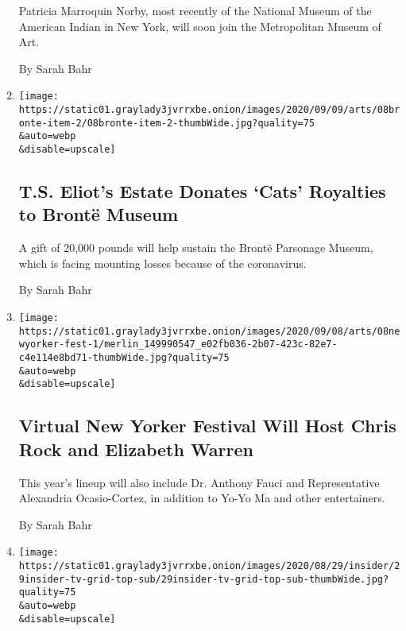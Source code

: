 \begin{enumerate}
  Patricia Marroquin Norby, most recently of the National Museum of the
  American Indian in New York, will soon join the Metropolitan Museum of
  Art.

  By Sarah Bahr
\item
  \href{/2020/09/08/arts/design/ts-eliot-cats-royalties-bronte-museum.html}{}

  \texttt{[image: https://static01.graylady3jvrrxbe.onion/images/2020/09/09/arts/08bronte-item-2/08bronte-item-2-thumbWide.jpg?quality=75\\\&auto=webp\\\&disable=upscale]}

  \hypertarget{ts-eliots-estate-donates-cats-royalties-to-brontuxeb-museum}{%
  \subsection{T.S. Eliot's Estate Donates `Cats' Royalties to Brontë
  Museum}\label{ts-eliots-estate-donates-cats-royalties-to-brontuxeb-museum}}

  A gift of 20,000 pounds will help sustain the Brontë Parsonage Museum,
  which is facing mounting losses because of the coronavirus.

  By Sarah Bahr
\item
  \href{/2020/09/08/arts/new-yorker-festival-chris-rock-elizabeth-warren.html}{}

  \texttt{[image: https://static01.graylady3jvrrxbe.onion/images/2020/09/08/arts/08newyorker-fest-1/merlin\_149990547\_e02fb036-2b07-423c-82e7-c4e114e8bd71-thumbWide.jpg?quality=75\\\&auto=webp\\\&disable=upscale]}

  \hypertarget{virtual-new-yorker-festival-will-host-chris-rock-and-elizabeth-warren}{%
  \subsection{Virtual New Yorker Festival Will Host Chris Rock and
  Elizabeth
  Warren}\label{virtual-new-yorker-festival-will-host-chris-rock-and-elizabeth-warren}}

  This year's lineup will also include Dr. Anthony Fauci and
  Representative Alexandria Ocasio-Cortez, in addition to Yo-Yo Ma and
  other entertainers.

  By Sarah Bahr
\item
  \href{/2020/08/28/insider/TV-listings-ending.html}{}

  \texttt{[image: https://static01.graylady3jvrrxbe.onion/images/2020/08/29/insider/29insider-tv-grid-top-sub/29insider-tv-grid-top-sub-thumbWide.jpg?quality=75\\\&auto=webp\\\&disable=upscale]}


\end{enumerate}

